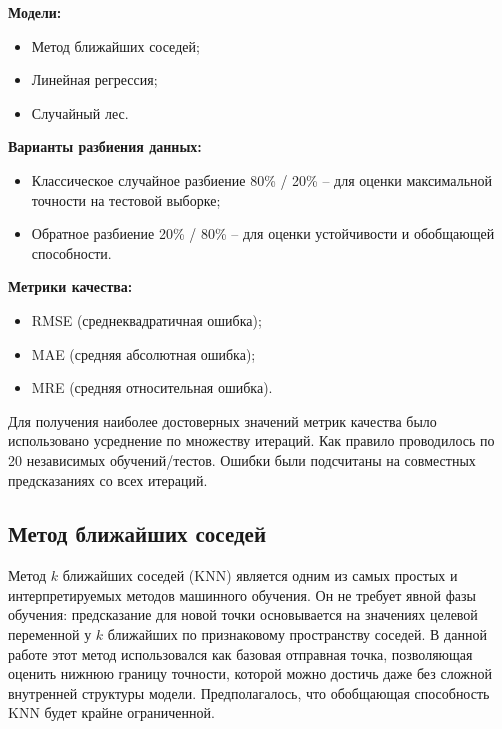 \documentclass[a4paper,12pt]{article}
\begin{document}
  \begin{minipage}{\textwidth}
    \textbf{Модели:}
    \begin{itemize}
      \item Метод ближайших соседей;
      \item Линейная регрессия;
      \item Случайный лес.
    \end{itemize}
  \end{minipage}
  
  \begin{minipage}{\textwidth}
    \textbf{Варианты разбиения данных:}
    \begin{itemize}
      \item Классическое случайное разбиение 80\% / 20\% -- для оценки максимальной точности на тестовой выборке;
      \item Обратное разбиение 20\% / 80\% -- для оценки устойчивости и обобщающей способности.
    \end{itemize}
  \end{minipage}
  
  \begin{minipage}{\textwidth}
    \textbf{Метрики качества:}
    \begin{itemize}
      \item RMSE (среднеквадратичная ошибка);
      \item MAE (средняя абсолютная ошибка);
      \item MRE (средняя относительная ошибка).
    \end{itemize}
  \end{minipage}

  Для получения наиболее достоверных значений метрик качества было использовано усреднение по множеству итераций. Как правило проводилось по 20 независимых обучений/тестов. Ошибки были подсчитаны на совместных предсказаниях со всех итераций.

  \subsection{Метод ближайших соседей}

    Метод \(k\) ближайших соседей (KNN) является одним из самых простых и интерпретируемых методов машинного обучения. Он не требует явной фазы обучения: предсказание для новой точки основывается на значениях целевой переменной у \(k\) ближайших по признаковому пространству соседей. В данной работе этот метод использовался как базовая отправная точка, позволяющая оценить нижнюю границу точности, которой можно достичь даже без сложной внутренней структуры модели. Предполагалось, что обобщающая способность KNN будет крайне ограниченной.
\end{document}
